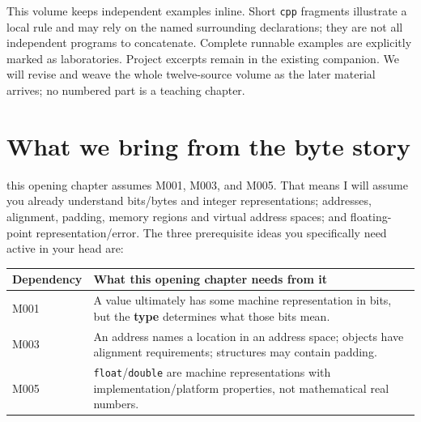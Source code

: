 This volume keeps independent examples inline. Short \texttt{cpp} fragments illustrate a local rule and may rely on the named surrounding declarations; they are not all independent programs to concatenate. Complete runnable examples are explicitly marked as laboratories. Project excerpts remain in the existing companion. We will revise and weave the whole twelve-source volume as the later material arrives; no numbered part is a teaching chapter.

\section{What we bring from the byte story}\label{05-engine-i-ch002-what-we-bring-from-the-byte-story}

\hypertarget{05-engine-i-ch002-what-we-bring-from-the-byte-story}{}

this opening chapter assumes M001, M003, and M005. That means I will assume you already understand bits/bytes and integer representations; addresses, alignment, padding, memory regions and virtual address spaces; and floating-point representation/error. The three prerequisite ideas you specifically need active in your head are:

{\def\LTcaptype{none} %
\begin{longtable}[]{@{}
  >{\raggedright\arraybackslash}p{}
  >{\raggedright\arraybackslash}p{}@{}}
\toprule\noalign{}
\begin{minipage}[b]{\linewidth}\raggedright
Dependency
\end{minipage} & \begin{minipage}[b]{\linewidth}\raggedright
What this opening chapter needs from it
\end{minipage} \\
\midrule\noalign{}
\endhead
\bottomrule\noalign{}
\endlastfoot
M001 & A value ultimately has some machine representation in bits, but the \textbf{type} determines what those bits mean. \\
M003 & An address names a location in an address space; objects have alignment requirements; structures may contain padding. \\
M005 & \texttt{float}/\texttt{double} are machine representations with implementation/platform properties, not mathematical real numbers. \\
\end{longtable}
}

